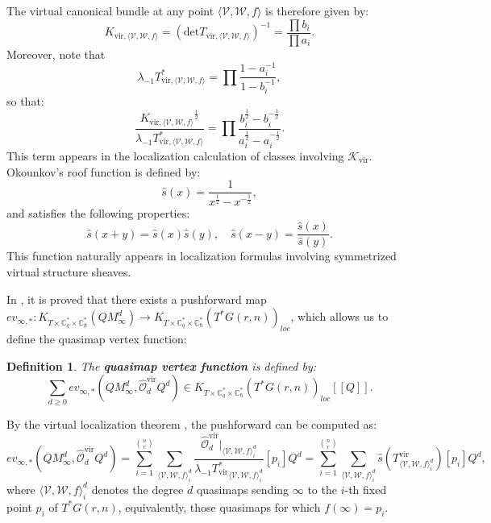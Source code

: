\documentclass{amsart}
\newtheorem{definition}{Definition}
\begin{document}
     The virtual canonical bundle at any point $\langle \mathcal{V},\mathcal{W},f \rangle$ is therefore given by: 
     \[
     K_{\mathrm{vir},\langle \mathcal{V},\mathcal{W},f \rangle}=(\mathrm{det}T_{\mathrm{vir},\langle \mathcal{V},\mathcal{W},f \rangle})^{-1} = \frac{\prod b_i}{\prod a_i}.
     \]
     Moreover,  note that 
     \[
     \lambda_{-1}T_{\mathrm{vir},\langle \mathcal{V},\mathcal{W},f \rangle}^* = \prod\frac{1 - a_i^{-1}}{1 - b_i^{-1}},
     \]
     so that: 
     \[
     \frac{{K_{\mathrm{vir},\langle \mathcal{V},\mathcal{W},f \rangle}}^{\frac{1}{2}}}{\lambda_{-1}T_{\mathrm{vir},\langle \mathcal{V},\mathcal{W},f \rangle}^*} = \prod \frac{b_i^{\frac{1}{2}}-b_i^{-\frac{1}{2}}}{a_i^{\frac{1}{2}}-a_i^{-\frac{1}{2}}}.
     \]
     This term appears in the localization calculation of classes involving $\mathcal{K}_{\mathrm{vir}}$. Okounkov's roof function is defined by:
     \[
     \hat{s}(x) = \frac{1}{x^{\frac{1}{2}}-x^{-\frac{1}{2}}},
     \]
     and satisfies the following properties: 
     \[
     \hat{s}(x+y) = \hat{s}(x)\hat{s}(y), \quad   \hat{s}(x-y)= \frac{\hat{s}(x)}{\hat{s}(y)}.
     \]
    This function naturally appears in localization formulas involving symmetrized virtual structure sheaves.
    
In \cite[Section 7.2]{MR3752463}, it is proved that there exists a pushforward map $ev_{{\infty},*}:K_{T \times \mathbb{C}^*_q \times \mathbb{C}^*_{\hbar}}(QM^d_{\infty}) \to K_{T \times \mathbb{C}^*_q \times \mathbb{C}^*_{\hbar}}(T^*G(r,n))_{loc}$, which allows us to define the quasimap vertex function:

\begin{definition} \label{vertex def}
    The {\bf quasimap vertex function} is defined by:
    \[
 \sum_{d \geq 0}ev_{{\infty}, *}(QM^d_{\infty}, \hat{\mathcal{O}}^{{\mathrm{vir}}}_d Q^d) \in K_{T \times \mathbb{C}^*_q \times \mathbb{C}^*_{\hbar}}(T^*G(r,n))_{loc}[[Q]].
    \]
\end{definition}

By the virtual localization theorem \cite{FK}, the pushforward can be computed as:
\begin{equation}\label{lastsection}
  ev_{{\infty},*}(QM^d_{\infty},\hat{\mathcal{O}}^{{\mathrm{vir}}}_d Q^d)= \sum_{i=1}^{\binom{n}{r}}\sum_{{\langle \mathcal{V}, \mathcal{W},f \rangle_i^d}}\frac{\hat{\mathcal{O}}^{\mathrm{vir}}_d \vert_{{\langle \mathcal{V}, \mathcal{W},f \rangle_i^d}}}{{{\lambda_{-1}T_{{\mathrm{vir}}}^*}}_{{\langle\mathcal{V}, \mathcal{W},f \rangle_i^d}}} [p_i] Q^d = \sum_{i=1}^{\binom{n}{r}}\sum_{{\langle \mathcal{V}, \mathcal{W},f \rangle_i^d}}\hat{s}(T^{\mathrm{vir}}_{{\langle\mathcal{V}, \mathcal{W},f \rangle_i^d}}) [p_i] Q^d,
\end{equation}
where $\langle \mathcal{V}, \mathcal{W},f \rangle_i^d$ denotes the degree $d$ quasimaps sending $\infty$ to the $i$-th fixed point $p_i$ of $T^*G(r,n)$, equivalently, those quasimaps for which $f(\infty) = p_i$.
 
\end{document}
